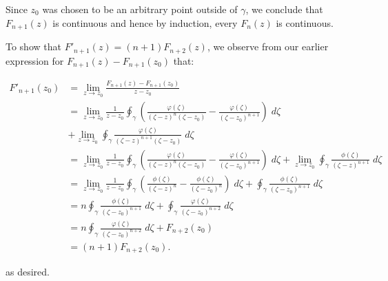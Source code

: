 \begin{solution}
    Since $z_0$ was chosen to be an arbitrary point outside of $\gamma$, we conclude that $F_{n+1}(z)$ is continuous and
    hence by induction, every $F_n(z)$ is continuous.
    
    
    To
    show that $F'_{n+1}(z) = (n + 1) F_{n+2}(z)$, we observe from our earlier expression for 
    $F_{n+1}(z) - F_{n+1}(z_0)$ that:

    \begin{align*}
        F'_{n+1}(z_0) &= \lim_{z \to z_0} \frac{F_{n+1}(z) - F_{n+1}(z_0)}{z - z_0} \\
                    &= \lim_{z \to z_0} \frac{1}{z - z_0}\oint_{\gamma} {\left(\frac{\varphi(\zeta)}{(\zeta - z)^{n}(\zeta - z_0)} - \frac{\varphi(\zeta)}{(\zeta - z_0)^{n+1}} \right) \; d\zeta} \\
                    &+ \lim_{z \to z_0} \oint_{\gamma} {\frac{\varphi(\zeta)}{(\zeta - z)^{n+1}(\zeta - z_0)} \; d\zeta} \\
                    &= \lim_{z \to z_0} \frac{1}{z - z_0}\oint_{\gamma} {\left(\frac{\varphi(\zeta)}{(\zeta - z)^{n}(\zeta - z_0)} - \frac{\varphi(\zeta)}{(\zeta - z_0)^{n+1}} \right) \; d\zeta}
                    + \lim_{z \to z_0} \oint_{\gamma} {\frac{\phi(\zeta)}{(\zeta - z)^{n+1}} \; d\zeta} \\
                    &= \lim_{z \to z_0} \frac{1}{z - z_0}\oint_{\gamma} {\left(\frac{\phi(\zeta)}{(\zeta - z)^{n}} - \frac{\phi(\zeta)}{(\zeta - z_0)^n} \right) \; d\zeta}
                    + \oint_{\gamma} {\frac{\phi(\zeta)}{(\zeta - z_0)^{n+1}} \; d\zeta} \\
                    &= n \oint_{\gamma} {\frac{\phi(\zeta)}{(\zeta - z_0)^{n+1}} \; d\zeta}
                    + \oint_{\gamma} {\frac{\varphi(\zeta)}{(\zeta - z_0)^{n+2}} \; d\zeta} \\
                    &= n \oint_{\gamma} {\frac{\varphi(\zeta)}{(\zeta - z_0)^{n+2}} \; d\zeta} + F_{n+2}(z_0) \\
                    &= (n + 1) F_{n+2}(z_0).
    \end{align*}

    as desired.
\end{solution}